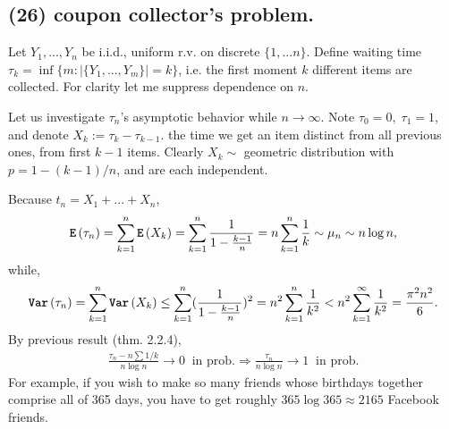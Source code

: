 \documentclass[12pt]{article}
\newcommand\oo\infty%
\newcommand\F\frac%
\newcommand{\Ip}{\Rightarrow} %
\newcommand{\Rb}[1]{ \left( #1 \right) }%
\newcommand{\Tw}[1]{\texttt{\textbf{#1}}}%
\newcommand{\EqGo}[1]{ \begin{gather*}{#1}\end{gather*} } %
\newcommand{\E}[1]{ \Tw{E}\Rb{#1} }%
\newcommand{\Var}[1]{ \Tw{Var}\Rb{#1} }%
\begin{document}
\subsection*{(26) coupon collector's problem. } Let \(Y_1,...,Y_n\) be i.i.d., uniform r.v. on discrete \(\{1,...n\}\). 
Define waiting time \(\tau_k = \inf\{ m: |\{Y_1,...,Y_m\}| =k \}\), 
i.e. the first moment \(k\) different items are collected. 
For clarity let me suppress dependence on \(n\). \par
Let us investigate \(\tau_n\)'s asymptotic behavior while \(n \to \oo\). 
Note \(\tau_0 =0,\; \tau_1 =1\), 
and denote \(X_k := \tau_k - \tau_{k-1}\). 
the time we get an item distinct from all previous ones, from first \(k-1\) items. 
Clearly \(X_k \sim\) geometric distribution with \(p= 1- (k-1)/n\), and are each independent. \par
Because \(t_n = X_1 +...+ X_n\), \EqGo{
 \E{\tau_n} = \sum_{k=1}^n \E{X_k}
 = \sum_{k=1}^n \F{1}{1- \F{k-1}{n}}
 = n \sum_{k=1}^n \F{1}{k} 
 \sim \mu_n 
 \sim n \log n,
} while, \EqGo{
 \Var{\tau_n} = \sum_{k=1}^n \Var{X_k}
 \leq \sum_{k=1}^n (\F{1}{1-\F{k-1}{n}})^2 
 = n^2 \sum_{k=1}^n \F{1}{k^2}
 < n^2 \sum_{k=1}^\oo \F{1}{k^2} = \F{\pi^2 n^2}{6}.
} By previous result (thm. 2.2.4), \EqGo{
 \F{ \tau_n - n \sum 1/k }{ n \log n } \to 0\;\; \textrm{in prob.} 
 \Ip \F{\tau_n}{n \log n} \to 1\;\; \textrm{in prob.}
} \indent For example, if you wish to make so many friends whose birthdays together comprise all of 365 days, 
you have to get roughly \(365 \log 365 \approx 2165\) Facebook friends. 
\end{document}
